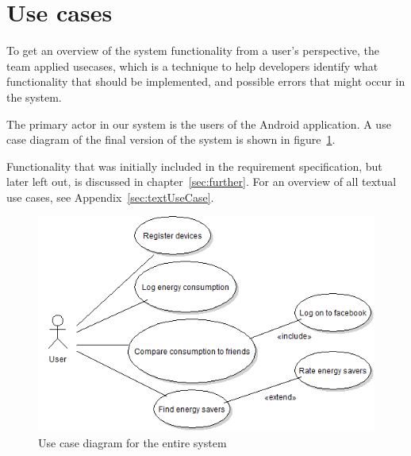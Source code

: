 \section{Use cases}
To get an overview of the system functionality from a user's perspective, the team applied \glspl{usecase}, which is a technique to help developers identify what functionality that should be implemented, and possible errors that might occur in the system.

The primary actor in our system is the users of the Android application. A use case diagram of the final version of the system is shown in figure~\ref{fig:usecase}.

Functionality that was initially included in the requirement specification, but later left out, is discussed in chapter~\ref{sec:further}. 
For an overview of all textual use cases, see Appendix~\ref{sec:textUseCase}.\\

\begin{figure}[H]
\includegraphics[width=\textwidth]{ch/specification/fig/currentUsecase.png}
\caption{Use case diagram for the entire system}
\label{fig:usecase}
\end{figure}
